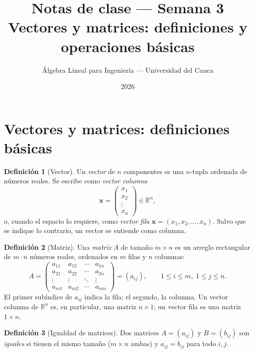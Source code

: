 \documentclass[11pt,letterpaper]{article}
\title{\textcolor{unicaucaverde}{\Large Notas de clase --- Semana 3}\\[4pt]
  \large Vectores y matrices: definiciones y operaciones básicas}
\author{Álgebra Lineal para Ingeniería --- Universidad del Cauca}
\date{2026}
\theoremstyle{definition}
\newtheorem{definicion}{Definición}[section]
\theoremstyle{plain}
\newcommand{\R}{\mathbb{R}}
\newcommand{\vv}[1]{\mathbf{#1}}
\begin{document}
\maketitle
\tableofcontents

\section{Vectores y matrices: definiciones básicas}

\begin{definicion}[Vector]
Un \emph{vector} de $n$ componentes es una $n$-tupla ordenada de números reales. Se escribe como
\emph{vector columna}
\[
  \vv{x} = \begin{pmatrix} x_1 \\ x_2 \\ \vdots \\ x_n \end{pmatrix} \in \R^n,
\]
o, cuando el espacio lo requiere, como \emph{vector fila} $\vv{x} = (x_1, x_2, \ldots, x_n)$. Salvo
que se indique lo contrario, un vector se entiende como columna.
\end{definicion}

\begin{definicion}[Matriz]
Una \emph{matriz} $A$ de tamaño $m\times n$ es un arreglo rectangular de $m\cdot n$ números reales,
ordenados en $m$ filas y $n$ columnas:
\[
  A = \begin{pmatrix}
    a_{11} & a_{12} & \cdots & a_{1n} \\
    a_{21} & a_{22} & \cdots & a_{2n} \\
    \vdots & \vdots & \ddots & \vdots \\
    a_{m1} & a_{m2} & \cdots & a_{mn}
  \end{pmatrix} = (a_{ij}), \qquad 1\leq i \leq m,\; 1\leq j \leq n.
\]
El primer subíndice de $a_{ij}$ indica la fila; el segundo, la columna. Un vector columna de
$\R^n$ es, en particular, una matriz $n\times 1$; un vector fila es una matriz $1\times n$.
\end{definicion}

\begin{definicion}[Igualdad de matrices]
Dos matrices $A=(a_{ij})$ y $B=(b_{ij})$ son \emph{iguales} si tienen el mismo tamaño ($m\times n$
ambas) y $a_{ij}=b_{ij}$ para todo $i,j$.
\end{definicion}
\end{document}
